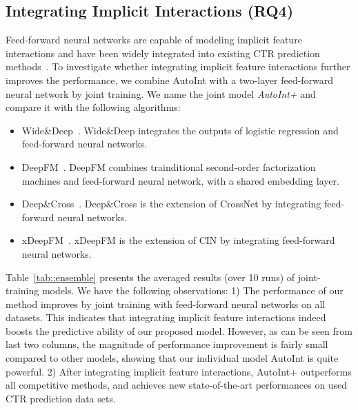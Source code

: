 \subsection{Integrating Implicit Interactions (RQ4)}\label{sec::joint}
Feed-forward neural networks are capable of modeling implicit feature interactions and have been widely integrated into existing CTR prediction methods~\cite{cheng2016wide,guo2017deepfm,lian2018xdeepfm}. To investigate whether integrating implicit feature interactions further improves the performance, we combine AutoInt with a two-layer feed-forward neural network by joint training. 
We name the joint model \textit{AutoInt+} and compare it with the following algorithms:
\begin{itemize}[leftmargin=*]
\item Wide\&Deep~\cite{cheng2016wide}. Wide\&Deep integrates the outputs of logistic regression and feed-forward neural networks.
\item DeepFM~\cite{guo2017deepfm}. DeepFM combines trainditional second-order factorization machines and feed-forward neural network, with a shared embedding layer.
\item Deep\&Cross~\cite{wang2017deep}. Deep\&Cross is the extension of CrossNet by integrating feed-forward neural networks.
\item xDeepFM~\cite{lian2018xdeepfm}. xDeepFM is the extension of CIN by integrating feed-forward neural networks.
\end{itemize}

Table~\ref{tab::ensemble} presents the averaged results (over 10 runs) of joint-training models. We have the following observations: 1) The performance of our method improves by joint training with feed-forward neural networks on all datasets. This indicates that integrating implicit feature interactions indeed boosts the predictive ability of our proposed model. However, as can be seen from last two columns, the magnitude of performance improvement is fairly small compared to other models, showing that our individual model AutoInt is quite powerful. 2) After integrating implicit feature interactions, AutoInt+ outperforms all competitive methods, and achieves new state-of-the-art performances on used CTR prediction data sets. 
